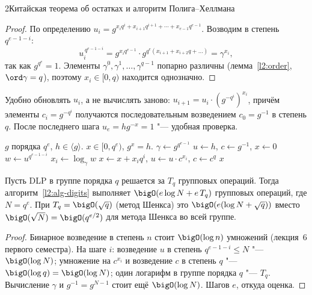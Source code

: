 \begin{lecture}{2}{Китайская теорема об остатках и алгоритм Полига–Хеллмана}
\begin{proof}
По определению $u_i = g^{x_i q^i + x_{i+1} q^{i+1} + \cdots + x_{e-1} q^{e-1}}$. Возводим в степень
$q^{e-1-i}$:
\[
  u_i^{\,q^{e-1-i}} = g^{x_i q^{e-1}} \cdot g^{q^e (x_{i+1} + x_{i+2} q + \dots)} = \gamma^{x_i},
\]
так как $g^{q^e} = 1$. Элементы $\gamma^0, \gamma^1, \dots, \gamma^{q-1}$ попарно различны
(лемма~\ref{l2:order}, $\ord \gamma = q$), поэтому $x_i \in [0, q)$ находится однозначно.
\end{proof}

Удобно обновлять $u_i$, а не вычислять заново: $u_{i+1} = u_i \cdot (g^{-q^i})^{x_i}$, причём
элементы $c_i = g^{-q^i}$ получаются последовательным возведением $c_0 = g^{-1}$ в степень $q$.
После последнего шага $u_e = h g^{-x} = 1$ "--- удобная проверка.

\begin{algorithm}\label{l2:alg-digits}
\begin{algorithmic}[1]
\Require $g$ порядка $q^e$, $h \in \langle g \rangle$.
\Ensure $x \in [0, q^e)$, $g^x = h$.
\State $\gamma \gets g^{q^{e-1}}$ 
\State $u \gets h$, \quad $c \gets g^{-1}$, \quad $x \gets 0$
  \State $w \gets u^{q^{e-1-i}}$ 
  \State $x_i \gets \log_\gamma w$ 
  \State $x \gets x + x_i q^i$, \quad $u \gets u \cdot c^{x_i}$, \quad $c \gets c^q$
\EndFor
\State \Return $x$
\end{algorithmic}
\end{algorithm}

\begin{proposition}\label{l2:digits-cost}
Пусть DLP в группе порядка $q$ решается за $T_q$ групповых операций. Тогда
алгоритм~\ref{l2:alg-digits} выполняет $\bigO(e \log N + e\,T_q)$ групповых операций, где
$N = q^e$. При $T_q = \bigO(\sqrt q)$ (метод Шенкса) это $\bigO(e(\log N + \sqrt q))$ вместо
$\bigO(\sqrt{N}) = \bigO(q^{e/2})$ для метода Шенкса во всей группе.
\end{proposition}

\begin{proof}
Бинарное возведение в степень $n$ стоит $\bigO(\log n)$ умножений (лекция~6 первого семестра).
На шаге $i$: возведение $u$ в степень $q^{e-1-i} \le N$ "--- $\bigO(\log N)$; умножение на
$c^{x_i}$ и возведение $c$ в степень $q$ "--- $\bigO(\log q) = \bigO(\log N)$; один логарифм
в группе порядка $q$ "--- $T_q$. Вычисление $\gamma$ и $g^{-1} = g^{N-1}$ стоит ещё $\bigO(\log N)$.
Шагов $e$, откуда оценка.
\end{proof}


\end{lecture}
